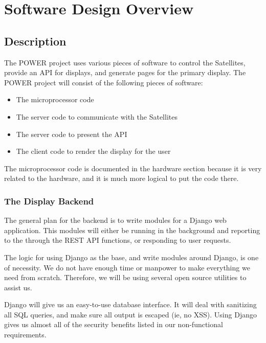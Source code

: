 
\chapter{Software Design Overview}

\section{Description}

The POWER project uses various pieces of software to control the Satellites, provide an API for displays, and generate pages for the primary display. The POWER project will consist of the following pieces of software:
\begin{itemize}
 \item The microprocessor code
 \item The server code to communicate with the Satellites
 \item The server code to present the API
 \item The client code to render the display for the user
\end{itemize}

The microprocessor code is documented in the hardware section because it is very related to the hardware, and it is much more logical to put the  code there.

\subsection{The Display Backend}

The general plan for the backend is to write modules for a Django web application. This modules will either be running in the background and reporting to the through the REST API functions, or responding to user requests.

The logic for using Django as the base, and write modules around Django, is one of necessity. We do not have enough time or manpower to make everything we need from scratch. Therefore, we will be using several open source utilities to assist us. 

Django will give us an easy-to-use database interface. It will deal with sanitizing all SQL queries, and make sure all output is escaped (ie, no XSS). Using Django gives us almost all of the security benefits listed in our non-functional requirements.

